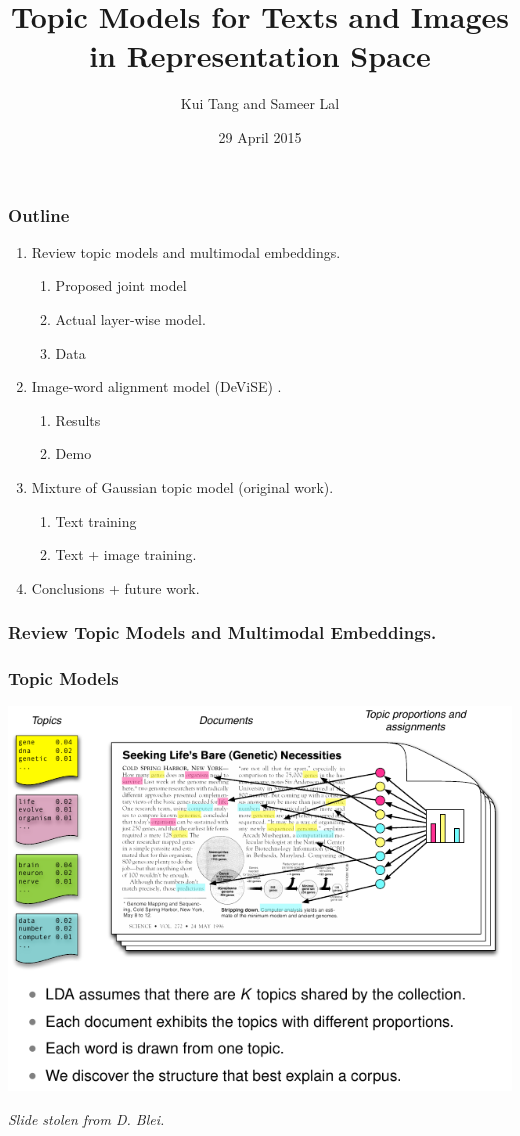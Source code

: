 \documentclass{beamer}
\title{Topic Models for Texts and Images in Representation Space}
\author{Kui Tang and Sameer Lal}
\institute{Columbia University}
\date{29 April 2015}
\begin{document}
\frame{\titlepage}

\begin{frame}
  \frametitle{Outline}
  \begin{enumerate}
    \item Review topic models and multimodal embeddings.
      \begin{enumerate}
        \item Proposed joint model
        \item Actual layer-wise model.
        \item Data
      \end{enumerate}
    \item Image-word alignment model (DeViSE) \citep{Frome13}.
      \begin{enumerate}
        \item Results
        \item Demo
      \end{enumerate}
    \item Mixture of Gaussian topic model (original work).
    \begin{enumerate}
      \item Text training
      \item Text + image training. 
    \end{enumerate}
    \item Conclusions + future work.
  \end{enumerate}
\end{frame}

\begin{frame}
  \frametitle{Review Topic Models and Multimodal Embeddings.}
\end{frame}

\begin{frame}
  \frametitle{Topic Models}
  {\centering \includegraphics[width=\textwidth]{assets/lda_colors.pdf}}
  {\small \emph{Slide stolen from D. Blei.} \par}
\end{frame}
\end{document}
